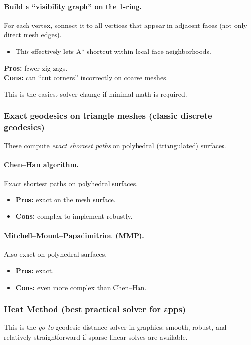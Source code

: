 \documentclass[12pt,a4paper]{article}
\theoremstyle{plain}
\theoremstyle{definition}
\begin{document}
	\paragraph{Build a ``visibility graph'' on the 1-ring.}
	For each vertex, connect it to all vertices that appear in adjacent faces (not only direct mesh edges).
	\begin{itemize}
		\item This effectively lets A* shortcut within local face neighborhoods.
	\end{itemize}
	\textbf{Pros:} fewer zig-zags. \\
	\textbf{Cons:} can ``cut corners'' incorrectly on coarse meshes.
	
	\medskip
	This is the easiest solver change if minimal math is required.
	
		\subsubsection*{Exact geodesics on triangle meshes (classic discrete geodesics)}
	These compute \emph{exact shortest paths} on polyhedral (triangulated) surfaces.
	
	\paragraph{Chen--Han algorithm.}
	Exact shortest paths on polyhedral surfaces.
	\begin{itemize}
		\item \textbf{Pros:} exact on the mesh surface.
		\item \textbf{Cons:} complex to implement robustly.
	\end{itemize}
	
	\paragraph{Mitchell--Mount--Papadimitriou (MMP).}
	Also exact on polyhedral surfaces.
	\begin{itemize}
		\item \textbf{Pros:} exact.
		\item \textbf{Cons:} even more complex than Chen--Han.
	\end{itemize}
	
		\subsubsection*{Heat Method (best practical solver for apps)}
	This is the \emph{go-to} geodesic distance solver in graphics:
	smooth, robust, and relatively straightforward if sparse linear solves are available.
	
\end{document}
